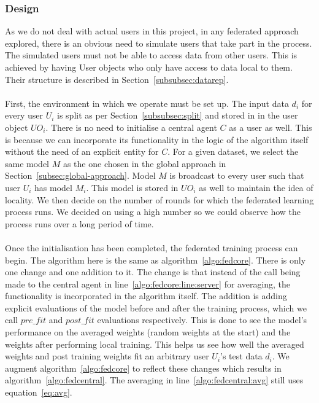 \documentclass[12pt]{article}
\begin{document}
\subsubsection{Design}
As we do not deal with actual users in this project, in any federated approach explored, there is an obvious need to simulate users that take part in the process. The simulated users must not be able to access data from other users. This is achieved by having User objects who only have access to data local to them. Their structure is described in Section~\ref{subsubsec:datarep}. 
\\\\
First, the environment in which we operate must be set up. The input data $d_i$ for every user $U_i$ is split as per Section~\ref{subsubsec:split} and stored in in the user object $UO_i$. There is no need to initialise a central agent $C$ as a user as well. This is because we can incorporate its functionality in the logic of the algorithm itself without the need of an explicit entity for $C$. For a given dataset, we select the same model $M$ as the one chosen in the global approach in Section~\ref{subsec:global-approach}. Model $M$ is broadcast to every user such that user $U_i$ has model $M_i$. This model is stored in $UO_i$ as well to maintain the idea of locality. We then decide on the number of rounds for which the federated learning process runs. We decided on using a high number so we could observe how the process runs over a long period of time. 
\\\\
Once the initialisation has been completed, the federated training process can begin. The algorithm here is the same as algorithm~\ref{algo:fedcore}. There is only one change and one addition to it. The change is that instead of the call being made to the central agent in line~\ref{algo:fedcore:line:server} for averaging, the functionality is incorporated in the algorithm itself. The addition is adding explicit evaluations of the model before and after the training process, which we call $pre\_fit$ and $post\_fit$ evaluations respectively. This is done to see the model's performance on the averaged weights (random weights at the start) and the weights after performing local training. This helps us see how well the averaged weights and post training weights fit an arbitrary user $U_i$'s test data $d_i$. We augment algorithm~\ref{algo:fedcore} to reflect these changes which results in algorithm~\ref{algo:fedcentral}. The averaging in line~\ref{algo:fedcentral:avg} still uses equation~\ref{eq:avg}.
\end{document}
